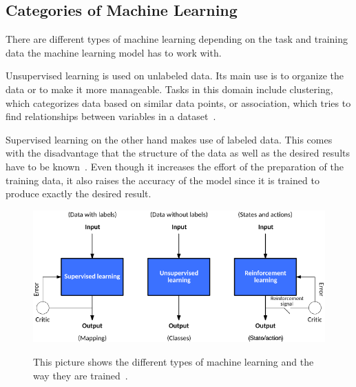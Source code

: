 
\subsection{Categories of Machine Learning}
There are different types of machine learning depending on the task and training data the machine learning model has to work with. %

Unsupervised learning is used on unlabeled data. Its main use is to organize the data or to make it more manageable. Tasks in this domain include clustering, which categorizes data based on similar data points, or association, which tries to find relationships between variables in a dataset~\cite{supervised-unsupervised-learning}.

Supervised learning on the other hand makes use of labeled data. This comes with the disadvantage that the structure of the data as well as the desired results have to be known~\cite{classical-ml}. Even though it increases the effort of the preparation of the training data, it also raises the accuracy of the model since it is trained to produce exactly the desired result.



\begin{figure}[ht]
  \caption[Different kinds of machine learning]{This picture shows the different types of machine learning and the way they are trained~\cite{types-of-ml}.} %
  \centering
  \includegraphics[width=\linewidth]{img/types_of_machine_learning.png}\label{fig:kinds_of_ml}
\end{figure}
